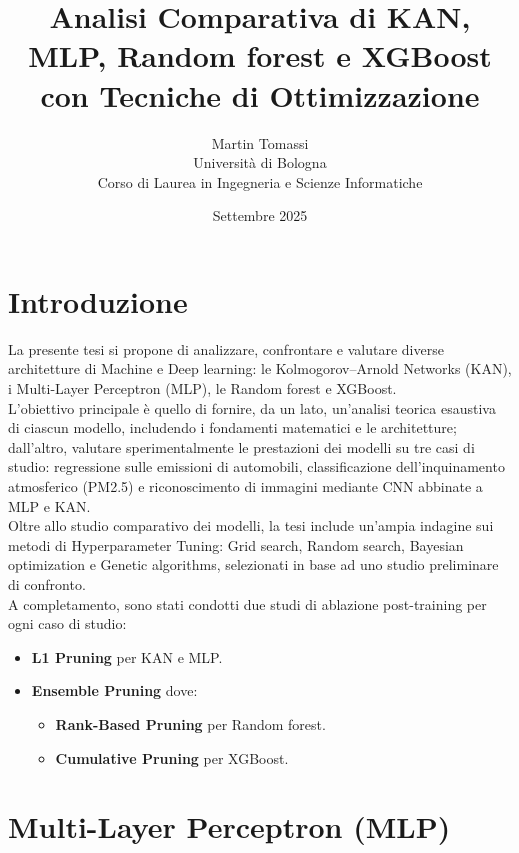 \documentclass[a4paper,12pt]{report}
\title{Analisi Comparativa di KAN, MLP, Random forest e XGBoost con Tecniche di Ottimizzazione}
\author{Martin Tomassi \\ Università di Bologna \\ Corso di Laurea in Ingegneria e Scienze Informatiche}
\date{Settembre 2025}
\begin{document}
	
	\maketitle
	
	\tableofcontents
	
	\chapter{Introduzione}
	La presente tesi si propone di analizzare, confrontare e valutare diverse architetture di Machine e Deep learning: le Kolmogorov–Arnold Networks (KAN), i Multi-Layer Perceptron (MLP), le Random forest e XGBoost. \\
	L’obiettivo principale è quello di fornire, da un lato, un’analisi teorica esaustiva di ciascun modello, includendo i fondamenti matematici e le architetture; dall’altro, valutare sperimentalmente le prestazioni dei modelli su tre casi di studio: regressione sulle emissioni di automobili, classificazione dell’inquinamento atmosferico (PM2.5) e riconoscimento di immagini mediante CNN abbinate a MLP e KAN. \\
	Oltre allo studio comparativo dei modelli, la tesi include un’ampia indagine sui metodi di Hyperparameter Tuning: Grid search, Random search, Bayesian optimization e Genetic algorithms, selezionati in base ad uno studio preliminare di confronto. \\
	A completamento, sono stati condotti due studi di ablazione post-training per ogni caso di studio:
	\begin{itemize}
		\item \textbf{L1 Pruning} per KAN e MLP.
		\item \textbf{Ensemble Pruning} dove:
		\begin{itemize}
			\item \textbf{Rank-Based Pruning} per Random forest.
			\item \textbf{Cumulative Pruning} per XGBoost.
		\end{itemize}
	\end{itemize}
	
	\chapter{Multi-Layer Perceptron (MLP)}
	
\end{document}
